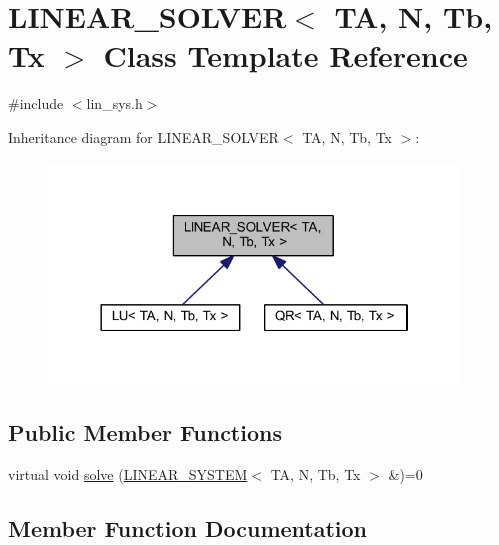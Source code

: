 \hypertarget{class_l_i_n_e_a_r___s_o_l_v_e_r}{}\section{L\+I\+N\+E\+A\+R\+\_\+\+S\+O\+L\+V\+ER$<$ TA, N, Tb, Tx $>$ Class Template Reference}
\label{class_l_i_n_e_a_r___s_o_l_v_e_r}


{\ttfamily \#include $<$lin\+\_\+sys.\+h$>$}



Inheritance diagram for L\+I\+N\+E\+A\+R\+\_\+\+S\+O\+L\+V\+ER$<$ TA, N, Tb, Tx $>$\+:
\nopagebreak
\begin{figure}[H]
\begin{center}
\leavevmode
\includegraphics[width=310pt]{class_l_i_n_e_a_r___s_o_l_v_e_r__inherit__graph}
\end{center}
\end{figure}
\subsection*{Public Member Functions}
\begin{DoxyCompactItemize}
\item 
virtual void \mbox{\hyperlink{class_l_i_n_e_a_r___s_o_l_v_e_r_a83c4d3b280e57814ec091dd9f8927c24}{solve}} (\mbox{\hyperlink{class_l_i_n_e_a_r___s_y_s_t_e_m}{L\+I\+N\+E\+A\+R\+\_\+\+S\+Y\+S\+T\+EM}}$<$ TA, N, Tb, Tx $>$ \&)=0
\end{DoxyCompactItemize}


\subsection{Member Function Documentation}
\mbox{\label{class_l_i_n_e_a_r___s_o_l_v_e_r_a83c4d3b280e57814ec091dd9f8927c24}} 
